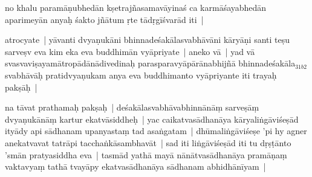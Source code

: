 \documentclass[article,12pt,a4paper]{memoir}%
\newcommand{\gap}[1]{}
\newcounter{parCount}
\begin{document}
	  \pstart \leavevmode%
	\label{thakur75-55.16}no khalu paramāṇubhedān kṣetrajñasamavāyinaś ca karmāśayabhedān aparimeyān anyaḥ śakto jñātum ṛte tādṛgīśvarād\label{ratnakīrtinibandhāvali__36r1NJ1HHMVH5RR7U2GTVWCF63V} iti |
	{}
	\pend%
      

	  \pstart \leavevmode%
	\label{thakur75-55.18}atrocyate | yāvanti dvyaṇukāni bhinnadeśakālasvabhāvāni kāryāṇi santi teṣu sarveṣv eva kim eka eva buddhimān vyāpriyate | aneko vā | yad vā svasvaviṣayamātropādānādivedinaḥ parasparavyāpārānabhijñā bhinnadeśakāla{\tiny $_{31b2}$}svabhāvāḥ pratidvyaṇukam anya eva buddhimanto vyāpriyante iti trayaḥ pakṣāḥ |
	{}
	\pend%
      

	  \pstart \leavevmode%
	\label{thakur75-55.22}na tāvat \label{ratnakīrtinibandhāvali__36r1NM7W6RLH3UQ01ZEG4Q53FWC}prathamaḥ pakṣaḥ |\label{ratnakīrtinibandhāvali__36r1NM7W6SG03AESJNSHQ1FK1L5} de\gap{}śakālasvabhāvabhinnānāṃ sarveṣāṃ dvyaṇukānāṃ kartur ekatvāsiddheḥ | yac caikatvasādhanāya kāryaliṅgāviśeṣād ityādy api sādhanam upanyastaṃ tad asaṅgatam | dhūmaliṅgāviśeṣe 'pi hy agner anekatvavat tatrāpi tacchaṅkāsambhavāt | \label{ratnakīrtinibandhāvali__36r1NSAWNTV0PU093F550ENXSD2}sad iti liṅgāviśeṣād\label{ratnakīrtinibandhāvali__36r1NSAWNTWQ48AKDPN5RIVJIC3} iti tu dṛṣṭānto 'smān pratyasiddha eva | tasmād yathā mayā nānātvasādhanāya pramāṇaṃ vaktavyaṃ tathā tvayāpy ekatvasādhanāya sādhanam abhidhānīyam |
	{}
	\pend%
      
\end{document}
